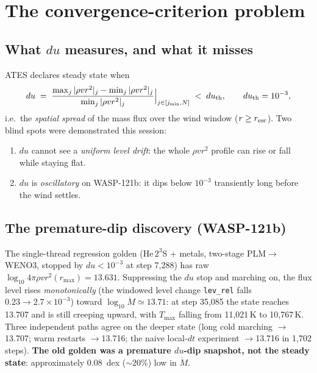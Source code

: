 \documentclass[english,a4paper]{my_memo}
\newcommand{\code}[1]{\texttt{#1}}
\begin{document}
\section{The convergence-criterion problem}\label{sec:conv}

\subsection{What $du$ measures, and what it misses}

ATES declares steady state when
\begin{equation}
du \;=\; \frac{\max_j |\rho v r^2|_j - \min_j |\rho v r^2|_j}
              {\min_j |\rho v r^2|_j}\Big|_{j\in[j_{\min},N]} \;<\; du_{\rm th},
\qquad du_{\rm th}=10^{-3},
\end{equation}
i.e.\ the \emph{spatial spread} of the mass flux over the wind window
($r\ge r_{\rm esc}$). Two blind spots were demonstrated this session:
\begin{enumerate}
\item $du$ cannot see a \emph{uniform level drift}: the whole $\rho v r^2$
  profile can rise or fall while staying flat.
\item $du$ is \emph{oscillatory} on WASP-121b: it dips below $10^{-3}$
  transiently long before the wind settles.
\end{enumerate}

\subsection{The premature-dip discovery (WASP-121b)}\label{sec:dip}

The single-thread regression golden (He\,$2^3$S + metals, two-stage
PLM$\to$WENO3, stopped by $du<10^{-3}$ at step 7{,}288) has raw
$\log_{10} 4\pi\rho v r^2(r_{\max}) = 13.631$. Suppressing the $du$ stop and
marching on, the flux level rises \emph{monotonically} (the windowed level
change \code{lev\_rel} falls $0.23\to2.7\times10^{-3}$) toward
$\log_{10}\dot M \simeq 13.71$:
at step 35{,}085 the state reaches 13.707 and is still creeping upward,
with $T_{\max}$ falling from 11{,}021\,K to 10{,}767\,K. Three independent
paths agree on the deeper state (long cold marching $\to$13.707; warm
restarts $\to$13.716; the naive local-$dt$ experiment $\to$13.716 in 1{,}702
steps). \textbf{The old golden was a premature $du$-dip snapshot, not the
steady state}: approximately $0.08$~dex ($\sim$20\%) low in $\dot M$.
\end{document}
